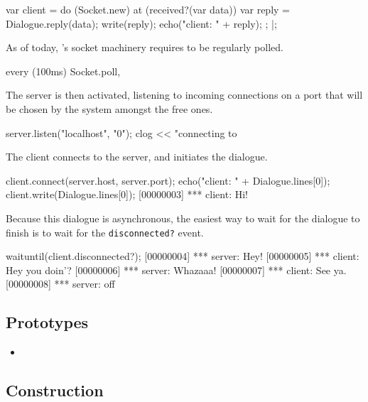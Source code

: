 \begin{urbiscript}[firstnumber=last]
var client =
  do (Socket.new)
  {
    at (received?(var data))
    {
      var reply = Dialogue.reply(data);
      write(reply);
      echo("client: " + reply);
    };
  }|;
\end{urbiscript}

As of today, \us's socket machinery requires to be regularly polled.

\begin{urbiscript}[firstnumber=last]
every (100ms)
  Socket.poll,
\end{urbiscript}

The server is then activated, listening to incoming connections on a
port that will be chosen by the system amongst the free ones.

\begin{urbiscript}[firstnumber=last]
server.listen("localhost", "0");
clog << "connecting to %
\end{urbiscript}

The client connects to the server, and initiates the dialogue.

\begin{urbiscript}[firstnumber=last]
client.connect(server.host, server.port);
echo("client: " + Dialogue.lines[0]);
client.write(Dialogue.lines[0]);
[00000003] *** client: Hi!
\end{urbiscript}

Because this dialogue is asynchronous, the easiest way to wait for the
dialogue to finish is to wait for the \lstinline|disconnected?| event.

\begin{urbiscript}[firstnumber=last]
waituntil(client.disconnected?);
[00000004] *** server: Hey!
[00000005] *** client: Hey you doin'?
[00000006] *** server: Whazaaa!
[00000007] *** client: See ya.
[00000008] *** server: off
\end{urbiscript}

\subsection{Prototypes}
\begin{itemize}
\item {}
\end{itemize}

\subsection{Construction}

